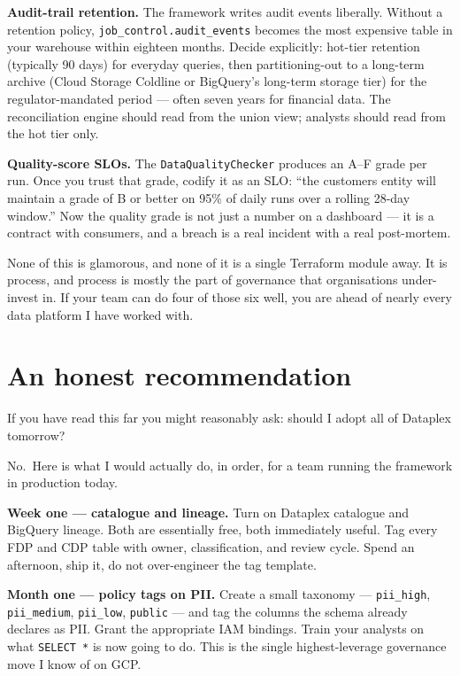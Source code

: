 \documentclass[
  11pt,
  british,
  oneside]{book}
\begin{document}
\textbf{Audit-trail retention.} The framework writes audit events
liberally. Without a retention policy,
\texttt{job\_control.audit\_events} becomes the most expensive table in
your warehouse within eighteen months. Decide explicitly: hot-tier
retention (typically 90 days) for everyday queries, then
partitioning-out to a long-term archive (Cloud Storage Coldline or
BigQuery's long-term storage tier) for the regulator-mandated period ---
often seven years for financial data. The reconciliation engine should
read from the union view; analysts should read from the hot tier only.

\textbf{Quality-score SLOs.} The \texttt{DataQualityChecker} produces an
A--F grade per run. Once you trust that grade, codify it as an SLO:
``the customers entity will maintain a grade of B or better on 95\% of
daily runs over a rolling 28-day window.'' Now the quality grade is not
just a number on a dashboard --- it is a contract with consumers, and a
breach is a real incident with a real post-mortem.

None of this is glamorous, and none of it is a single Terraform module
away. It is process, and process is mostly the part of governance that
organisations under-invest in. If your team can do four of those six
well, you are ahead of nearly every data platform I have worked with.

\hypertarget{an-honest-recommendation}{%
\section{An honest recommendation}\label{an-honest-recommendation}}

If you have read this far you might reasonably ask: should I adopt all
of Dataplex tomorrow?

No.~Here is what I would actually do, in order, for a team running the
framework in production today.

\textbf{Week one --- catalogue and lineage.} Turn on Dataplex catalogue
and BigQuery lineage. Both are essentially free, both immediately
useful. Tag every FDP and CDP table with owner, classification, and
review cycle. Spend an afternoon, ship it, do not over-engineer the tag
template.

\textbf{Month one --- policy tags on PII.} Create a small taxonomy ---
\texttt{pii\_high}, \texttt{pii\_medium}, \texttt{pii\_low},
\texttt{public} --- and tag the columns the schema already declares as
PII. Grant the appropriate IAM bindings. Train your analysts on what
\texttt{SELECT\ *} is now going to do. This is the single
highest-leverage governance move I know of on GCP.
\end{document}
